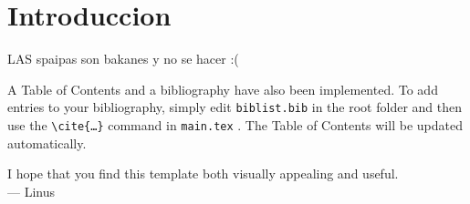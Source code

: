 \documentclass[12pt]{article}
\begin{document}
\tableofcontents  %

\listoftables  %

\listoffigures  %

\pagebreak


\section{Introduccion}
LAS spaipas son bakanes y no se hacer :(



A Table of Contents and a bibliography have also been implemented. To add entries to your bibliography, simply edit \texttt{biblist.bib} in the root folder and then use the \texttt{\textbackslash cite\{\ldots\}} command in \texttt{main.tex} \cite{bibtex}. The Table of Contents will be updated automatically.

I hope that you find this template both visually appealing and useful. \\

\hspace{1 cm}--- Linus




\newpage



\end{document}
